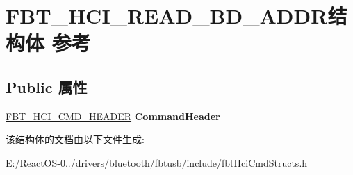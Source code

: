 \hypertarget{struct_f_b_t___h_c_i___r_e_a_d___b_d___a_d_d_r}{}\section{F\+B\+T\+\_\+\+H\+C\+I\+\_\+\+R\+E\+A\+D\+\_\+\+B\+D\+\_\+\+A\+D\+D\+R结构体 参考}
\label{struct_f_b_t___h_c_i___r_e_a_d___b_d___a_d_d_r}
\subsection*{Public 属性}
\begin{DoxyCompactItemize}
\item 
\mbox{\label{struct_f_b_t___h_c_i___r_e_a_d___b_d___a_d_d_r_afccd358eca946f65a630e2b9158d3f0c}} 
\hyperlink{struct_f_b_t___h_c_i___c_m_d___h_e_a_d_e_r}{F\+B\+T\+\_\+\+H\+C\+I\+\_\+\+C\+M\+D\+\_\+\+H\+E\+A\+D\+ER} {\bfseries Command\+Header}
\end{DoxyCompactItemize}


该结构体的文档由以下文件生成\+:\begin{DoxyCompactItemize}
\item 
E\+:/\+React\+O\+S-\/0../drivers/bluetooth/fbtusb/include/fbt\+Hci\+Cmd\+Structs.\+h\end{DoxyCompactItemize}
